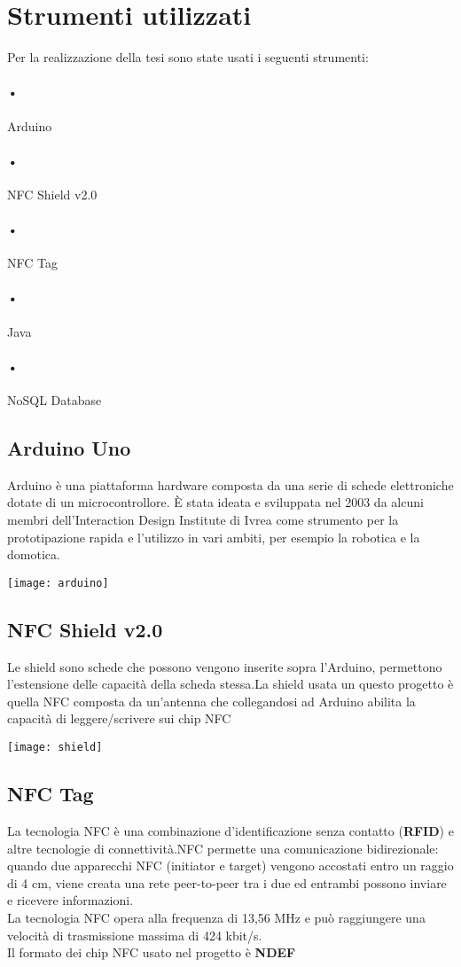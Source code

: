 \section{Strumenti utilizzati}

Per la realizzazione della tesi sono state usati i seguenti strumenti:
\paragraph{•} Arduino 
\paragraph{•} NFC Shield v2.0
\paragraph{•} NFC Tag
\paragraph{•} Java
\paragraph{•} NoSQL Database

\subsection{Arduino Uno}
Arduino è una piattaforma hardware composta da una serie di schede elettroniche dotate di un microcontrollore. È stata ideata e sviluppata nel 2003 da alcuni membri dell'Interaction Design Institute di Ivrea come strumento per la prototipazione rapida e l'utilizzo in vari ambiti, per esempio la robotica e la domotica.
\begin{center}
\texttt{[image: arduino]}
\end{center}
\subsection{NFC Shield v2.0}
Le shield sono schede che possono vengono inserite sopra l'Arduino, permettono l'estensione delle capacità della scheda stessa.La shield usata un questo progetto è quella NFC composta da un'antenna che collegandosi ad Arduino abilita la capacità di leggere/scrivere sui chip NFC
\begin{center}
\texttt{[image: shield]}
\end{center}
\subsection{NFC Tag}
La tecnologia NFC  è una combinazione d'identificazione senza contatto (\textbf{RFID}) e altre tecnologie di connettività.NFC permette una comunicazione bidirezionale: quando due apparecchi NFC (initiator e target) vengono accostati entro un raggio di 4 cm, viene creata una rete peer-to-peer tra i due ed entrambi possono inviare e ricevere informazioni.
\\La tecnologia NFC opera alla frequenza di 13,56 MHz e può raggiungere una velocità di trasmissione massima di 424 kbit/s.
\\Il formato dei chip NFC usato nel progetto è \textbf{NDEF} 
